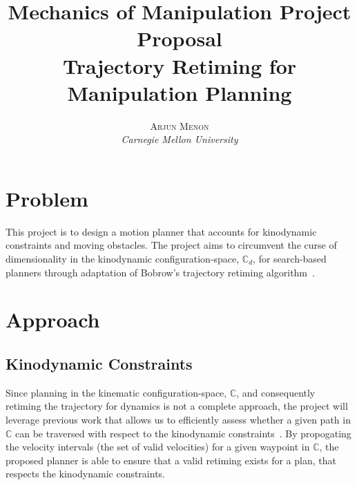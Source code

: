 \documentclass[letterpaper,10pt]{article} %
\title{\textbf{Mechanics of Manipulation Project Proposal}\\ %
Trajectory Retiming for Manipulation Planning} %
\author{\textsc{Arjun Menon} %
\\{\textit{Carnegie Mellon University}}} %
\makeatletter
\renewcommand{\maketitle}{ %
\begin{flushright} %
{\LARGE\@title} %

\vspace{5pt} %

{\large\@author} %
\vspace{0pt} %
\end{flushright}
}
\makeatother
\begin{document}
\maketitle %



%
%
%


\section{Problem}

This project is to design a motion planner that accounts for kinodynamic constraints and moving obstacles. The project aims to circumvent the curse of dimensionality in the kinodynamic configuration-space, $\mathbb{C}_d$, for search-based planners through adaptation of Bobrow's trajectory retiming algorithm~\cite{bobrow1985time}.

\section{Approach}\label{sec:approach}

\subsection{Kinodynamic Constraints}\label{sec:constraints}

Since planning in the kinematic configuration-space, $\mathbb{C}$, and consequently retiming the trajectory for dynamics is not a complete approach, the project will leverage previous work that allows us to efficiently assess whether a given path in $\mathbb{C}$ can be traversed with respect to the kinodynamic constraints~\cite{pham2013velocity}. By propogating the velocity intervals (the set of valid velocities) for a given waypoint in $\mathbb{C}$, the proposed planner is able to ensure that a valid retiming exists for a plan, that respects the kinodynamic constraints.
\end{document}
